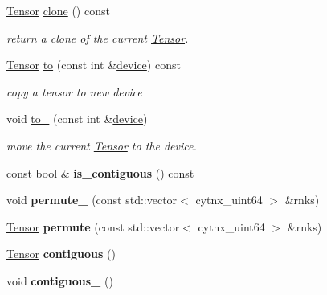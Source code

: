 \begin{DoxyCompactItemize}
\hyperlink{classcytnx_1_1Tensor}{Tensor} \hyperlink{classcytnx_1_1Tensor_a5e2248e9babdb786167ed349df9084ae}{clone} () const
\begin{DoxyCompactList}\small\item\em return a clone of the current \hyperlink{classcytnx_1_1Tensor}{Tensor}. \end{DoxyCompactList}\item 
\hyperlink{classcytnx_1_1Tensor}{Tensor} \hyperlink{classcytnx_1_1Tensor_acf7f697a9434f9bc98a7d00a555ee982}{to} (const int \&\hyperlink{classcytnx_1_1Tensor_ac6d3310eb4defbdacf662dcd81d8fe09}{device}) const
\begin{DoxyCompactList}\small\item\em copy a tensor to new device \end{DoxyCompactList}\item 
void \hyperlink{classcytnx_1_1Tensor_a114a31fbb8bf4a90f150b6a67e42183a}{to\+\_\+} (const int \&\hyperlink{classcytnx_1_1Tensor_ac6d3310eb4defbdacf662dcd81d8fe09}{device})
\begin{DoxyCompactList}\small\item\em move the current \hyperlink{classcytnx_1_1Tensor}{Tensor} to the device. \end{DoxyCompactList}\item 
\mbox{\label{classcytnx_1_1Tensor_a6a1d9ed962b0e9a484e2bb0de15eb76d}} 
const bool \& {\bfseries is\+\_\+contiguous} () const
\item 
\mbox{\label{classcytnx_1_1Tensor_a18f27d1fff73e4fb4109bc8faf3b5ace}} 
void {\bfseries permute\+\_\+} (const std\+::vector$<$ cytnx\+\_\+uint64 $>$ \&rnks)
\item 
\mbox{\label{classcytnx_1_1Tensor_a6bab89872014cf91dba63b38d9a2b3ea}} 
\hyperlink{classcytnx_1_1Tensor}{Tensor} {\bfseries permute} (const std\+::vector$<$ cytnx\+\_\+uint64 $>$ \&rnks)
\item 
\mbox{\label{classcytnx_1_1Tensor_a127e50508e1ee0eadf11601d66d76988}} 
\hyperlink{classcytnx_1_1Tensor}{Tensor} {\bfseries contiguous} ()
\item 
\mbox{\label{classcytnx_1_1Tensor_a405470654ef4ef5fc0b1d24754a3daf9}} 
void {\bfseries contiguous\+\_\+} ()
\item 

\end{DoxyCompactItemize}
